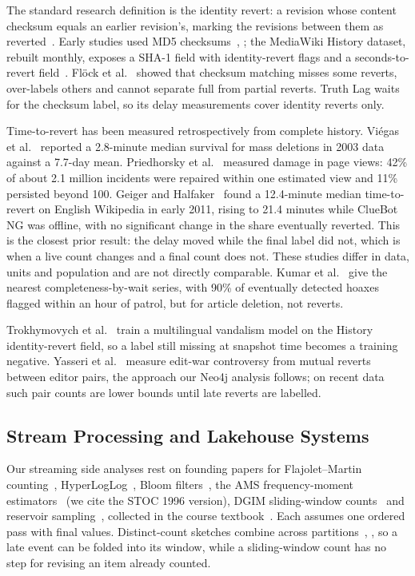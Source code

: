 The standard research definition is the identity revert: a revision whose content checksum equals an earlier revision's, marking the revisions between them as reverted~\cite{W05_researchrevert}. Early studies used MD5 checksums~\cite{W09_priedhorsky2007}, \cite{W22_yasseri2012}; the MediaWiki History dataset, rebuilt monthly, exposes a SHA-1 field with identity-revert flags and a seconds-to-revert field~\cite{W02_mwhistorydumps}. Fl\"ock et al.~\cite{W01_flock2012} showed that checksum matching misses some reverts, over-labels others and cannot separate full from partial reverts. Truth Lag waits for the checksum label, so its delay measurements cover identity reverts only.

Time-to-revert has been measured retrospectively from complete history. Vi\'egas et al.~\cite{W08_viegas2004} reported a 2.8-minute median survival for mass deletions in 2003 data against a 7.7-day mean. Priedhorsky et al.~\cite{W09_priedhorsky2007} measured damage in page views: 42\% of about 2.1 million incidents were repaired within one estimated view and 11\% persisted beyond 100. Geiger and Halfaker~\cite{W11_geiger2013} found a 12.4-minute median time-to-revert on English Wikipedia in early 2011, rising to 21.4 minutes while ClueBot NG was offline, with no significant change in the share eventually reverted. This is the closest prior result: the delay moved while the final label did not, which is when a live count changes and a final count does not. These studies differ in data, units and population and are not directly comparable. Kumar et al.~\cite{W12_kumar2016} give the nearest completeness-by-wait series, with 90\% of eventually detected hoaxes flagged within an hour of patrol, but for article deletion, not reverts.

Trokhymovych et al.~\cite{W19_trokhymovych2023} train a multilingual vandalism model on the History identity-revert field, so a label still missing at snapshot time becomes a training negative. Yasseri et al.~\cite{W22_yasseri2012} measure edit-war controversy from mutual reverts between editor pairs, the approach our Neo4j analysis follows; on recent data such pair counts are lower bounds until late reverts are labelled.

\subsection{Stream Processing and Lakehouse Systems}

Our streaming side analyses rest on founding papers for Flajolet--Martin counting~\cite{S04_flajolet1985}, HyperLogLog~\cite{S05_flajolet2007}, Bloom filters~\cite{S02_bloom1970}, the AMS frequency-moment estimators~\cite{S07a_alon1996} (we cite the STOC 1996 version), DGIM sliding-window counts~\cite{S08_datar2002} and reservoir sampling~\cite{S01_vitter1985}, collected in the course textbook~\cite{S12_leskovec2020}. Each assumes one ordered pass with final values. Distinct-count sketches combine across partitions~\cite{S04_flajolet1985}, \cite{S05_flajolet2007}, so a late event can be folded into its window, while a sliding-window count has no step for revising an item already counted.

